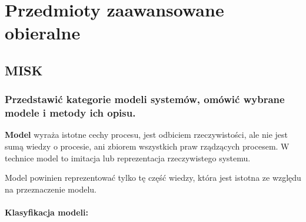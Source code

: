 {\let\clearpage\relax\chapter{Przedmioty zaawansowane obieralne}}


\section{MISK}
\subsection{Przedstawić kategorie modeli systemów, omówić wybrane
modele i metody ich opisu.}
\textbf{Model} wyraża istotne cechy procesu, jest odbiciem rzeczywistości, ale nie jest sumą wiedzy o procesie, ani zbiorem wszystkich praw rządzących procesem. W technice model to imitacja lub reprezentacja rzeczywistego systemu.

Model powinien reprezentować tylko tę część wiedzy, która jest istotna
ze względu na przeznaczenie modelu.
\\\\

\textbf{Klasyfikacja modeli:}

